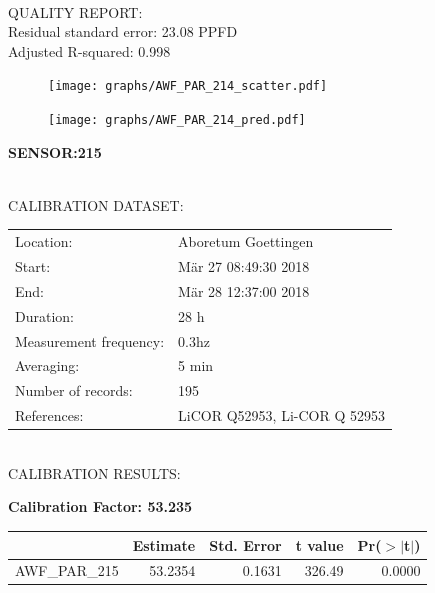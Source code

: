 \documentclass[oneside]{report}
\begin{document}
\hrulefill\\
QUALITY REPORT:\\
Residual standard error: 23.08 PPFD\\
Adjusted R-squared: 0.998



\begin{figure}[H]
  \centering
  \texttt{[image: graphs/AWF\_PAR\_214\_scatter.pdf]}
\end{figure}




\begin{figure}[H]
  \centering
  \texttt{[image: graphs/AWF\_PAR\_214\_pred.pdf]}
\end{figure}

\pagebreak


\begin{center}
\large{\textbf{SENSOR:215}}\\
\end{center}

\hrulefill\\
CALIBRATION DATASET:\\
\begin{table}[h!]
  \centering
  \label{tab:table1}
  \begin{tabular}{ll}
    Location: & Aboretum Goettingen\\ 
    
    
    Start:  & Mär 27 08:49:30 2018 \\
    End:   & Mär 28 12:37:00 2018\\ 
    Duration: & 28 h\\
    Measurement frequency: & 0.3hz\\
    Averaging:  &5 min\\
    Number of records: & 195 \\
    References: & LiCOR Q52953, Li-COR Q 52953 \\
  \end{tabular}
\end{table}

\hrulefill\\
CALIBRATION RESULTS:\\


\begin{center}
\textbf{\large{Calibration Factor: 53.235}}\\
\end{center}
\begin{table}[ht]
\centering
\begin{tabular}{rrrrr}
  \hline
 & Estimate & Std. Error & t value & Pr($>$$|$t$|$) \\ 
  \hline
AWF\_PAR\_215 & 53.2354 & 0.1631 & 326.49 & 0.0000 \\ 
   \hline
\end{tabular}
\end{table}
\end{document}
